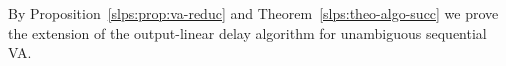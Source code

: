 By Proposition~\ref{slps:prop:va-reduc} and Theorem~\ref{slps:theo-algo-succ} we prove the extension of the  output-linear delay algorithm for unambiguous sequential VA.  



